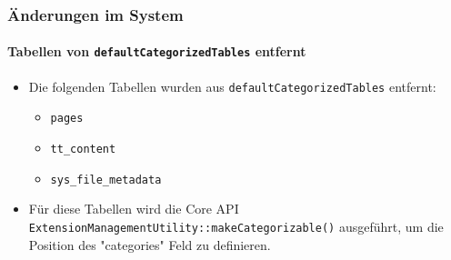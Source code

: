 \begin{frame}[fragile]
	\frametitle{Änderungen im System}
	\framesubtitle{Tabellen von \texttt{defaultCategorizedTables} entfernt}

	\begin{itemize}
		\item Die folgenden Tabellen wurden aus \texttt{defaultCategorizedTables} entfernt:

			\begin{itemize}
				\item \texttt{pages}
				\item \texttt{tt\_content}
				\item \texttt{sys\_file\_metadata}
			\end{itemize}

		\item Für diese Tabellen wird die Core API\newline
			\texttt{ExtensionManagementUtility::makeCategorizable()}\newline
			ausgeführt, um die Position des "categories" Feld zu definieren.

	\end{itemize}

\end{frame}


